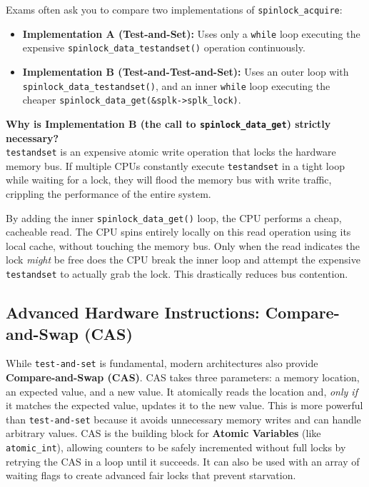 \begin{tcolorbox}[colback=blue!5!white,colframe=blue!75!black,title=Exam Insight: Spinlock Implementation (e.g. Q4 2022-09-08)]
Exams often ask you to compare two implementations of \texttt{spinlock\_acquire}:
\begin{itemize}
    \item \textbf{Implementation A (Test-and-Set):} Uses only a \texttt{while} loop executing the expensive \texttt{spinlock\_data\_testandset()} operation continuously. 
    \item \textbf{Implementation B (Test-and-Test-and-Set):} Uses an outer loop with \texttt{spinlock\_data\_testandset()}, and an inner \texttt{while} loop executing the cheaper \texttt{spinlock\_data\_get(\&splk->splk\_lock)}.
\end{itemize}

\textbf{Why is Implementation B (the call to \texttt{spinlock\_data\_get}) strictly necessary?} \\
\texttt{testandset} is an expensive atomic write operation that locks the hardware memory bus. If multiple CPUs constantly execute \texttt{testandset} in a tight loop while waiting for a lock, they will flood the memory bus with write traffic, crippling the performance of the entire system. 

By adding the inner \texttt{spinlock\_data\_get()} loop, the CPU performs a cheap, cacheable read. The CPU spins entirely locally on this read operation using its local cache, without touching the memory bus. Only when the read indicates the lock \textit{might} be free does the CPU break the inner loop and attempt the expensive \texttt{testandset} to actually grab the lock. This drastically reduces bus contention.
\end{tcolorbox}

\subsection{Advanced Hardware Instructions: Compare-and-Swap (CAS)}
While \texttt{test-and-set} is fundamental, modern architectures also provide \textbf{Compare-and-Swap (CAS)}. CAS takes three parameters: a memory location, an expected value, and a new value. It atomically reads the location and, \textit{only if} it matches the expected value, updates it to the new value. 
This is more powerful than \texttt{test-and-set} because it avoids unnecessary memory writes and can handle arbitrary values. CAS is the building block for \textbf{Atomic Variables} (like \texttt{atomic\_int}), allowing counters to be safely incremented without full locks by retrying the CAS in a loop until it succeeds. It can also be used with an array of waiting flags to create advanced fair locks that prevent starvation.

